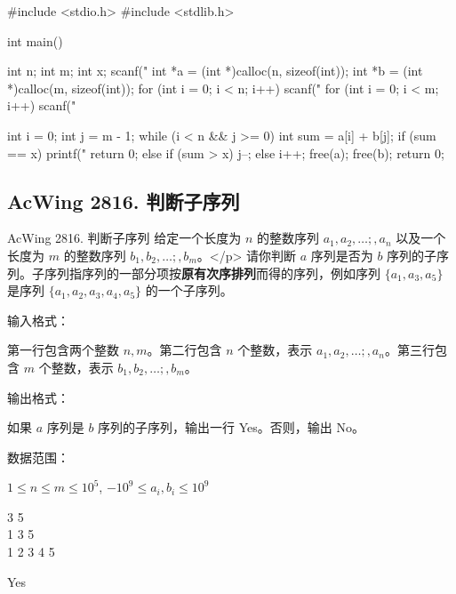 \begin{mycpptwocol}[数组元素的目标和]
    #include <stdio.h>
    #include <stdlib.h>

    int main() {
        int n;
        int m;
        int x;
        scanf("%
        int *a = (int *)calloc(n, sizeof(int));
        int *b = (int *)calloc(m, sizeof(int));
        for (int i = 0; i < n; i++) {
            scanf("%
        }
        for (int i = 0; i < m; i++) {
            scanf("%
        }

        int i = 0;
        int j = m - 1;
        while (i < n && j >= 0) {
            int sum = a[i] + b[j];
            if (sum == x) {
                printf("%
                return 0;
            } else if (sum > x) {
                j--;
            } else {
                i++;
            }
        }
        free(a);
        free(b);
        return 0;
    }
\end{mycpptwocol}

\subsection{AcWing 2816. 判断子序列}
\begin{titledbox}{AcWing 2816. 判断子序列}
    给定一个长度为 $n$ 的整数序列 $a_1,a_2,\dots;,a_n$ 以及一个长度为 $m$ 的整数序列 $b_1,b_2,\dots;,b_m$。</p>
    请你判断 $a$ 序列是否为 $b$ 序列的子序列。子序列指序列的一部分项按\textbf{原有次序排列}而得的序列，例如序列 $\{a_1,a_3,a_5\}$ 是序列 $\{a_1,a_2,a_3,a_4,a_5\}$ 的一个子序列。

    输入格式：

    第一行包含两个整数 $n,m$。第二行包含 $n$ 个整数，表示 $a_1,a_2,\dots;,a_n$。第三行包含 $m$ 个整数，表示 $b_1,b_2,\dots;,b_m$。

    输出格式：

    如果 $a$ 序列是 $b$ 序列的子序列，输出一行 Yes。否则，输出 No。

    数据范围：

    $1 \le n \le m \le 10^5$, $-10^9 \le a_i,b_i \le 10^9$

    \begin{inputblock}
        3 5 \\
        1 3 5 \\
        1 2 3 4 5
    \end{inputblock}
    \begin{outputblock}
        Yes
    \end{outputblock}
\end{titledbox}

